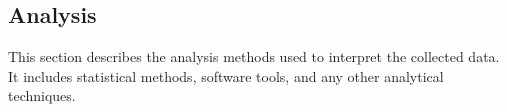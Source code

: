 \subsection{Analysis}

This section describes the analysis methods used to interpret the collected data. It includes statistical methods, software tools, and any other analytical techniques.